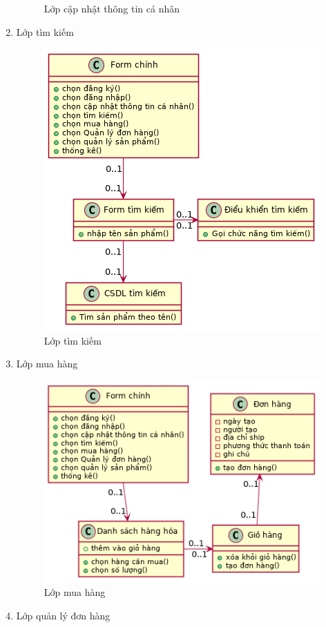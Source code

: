 \begin{enumerate}[label=\textbf{\alph*)}]
\begin{figure}[h!]
		      \caption{Lớp cập nhật thông tin cá nhân}
	      \end{figure}
	\item Lớp tìm kiếm
	      \begin{figure}[h!]
		      \centering
		      \includegraphics[scale=0.7]{fig/class_timkiem.png}
		      \caption{Lớp tìm kiếm}
	      \end{figure}
          \newpage
	\item Lớp mua hàng
	      \begin{figure}[h!]
		      \centering
		      \includegraphics[scale=0.7]{fig/class_muahang.png}
		      \caption{Lớp mua hàng}
	      \end{figure}
	\item Lớp quản lý đơn hàng
	      \begin{figure}[h!]

\end{figure}
\end{enumerate}
